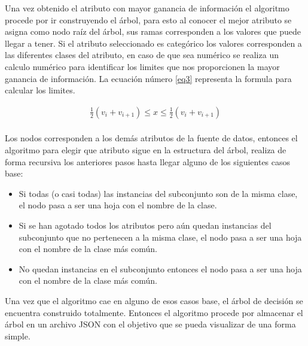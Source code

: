 \documentclass[letterpaper, 10 pt, conference]{ieeeconf}
\begin{document}
\begin{itemize}[leftmargin=*]
    Una vez obtenido el atributo con mayor ganancia de información el algoritmo procede por ir construyendo el árbol, para esto al conocer el mejor atributo se asigna como nodo raíz del árbol, sus ramas corresponden a los valores que puede llegar a tener. Si el atributo seleccionado es categórico los valores corresponden a las diferentes clases del atributo, en caso de que sea numérico se realiza un calculo numérico para identificar los limites que nos proporcionen la mayor ganancia de información. La ecuación número \ref{eq3} representa la formula para calcular los limites.
    
    \begin{equation} \label{eq3}
    \begin{split}
    \frac{1}{2}(v_{i}+v_{i+1}) \leq x \leq \frac{1}{2}(v_{i}+v_{i+1})
    \end{split}
    \end{equation}\\
    
    Los nodos corresponden a los demás atributos de la fuente de datos, entonces el algoritmo para elegir que atributo sigue en la estructura del árbol, realiza de forma recursiva los anteriores pasos hasta llegar alguno de los siguientes casos base:\\
    
    \begin{itemize}
        \item Si todas (o casi todas) las instancias del subconjunto son de la misma clase, el nodo pasa a ser una hoja con el nombre de la clase.\\
        
        \item Si se han agotado todos los atributos pero aún quedan instancias del subconjunto que no pertenecen a la misma clase, el nodo pasa a ser una hoja con el nombre de la clase más común.\\
        
        \item No quedan instancias en el subconjunto entonces el nodo pasa a ser una hoja con el nombre de la clase más común.\\
    \end{itemize}
    
    Una vez que el algoritmo cae en alguno de esos casos base, el árbol de decisión se encuentra construido totalmente. Entonces el algoritmo procede por almacenar el árbol en un archivo JSON con el objetivo que se pueda visualizar de una forma simple.\\
    

\end{itemize}
\end{document}
